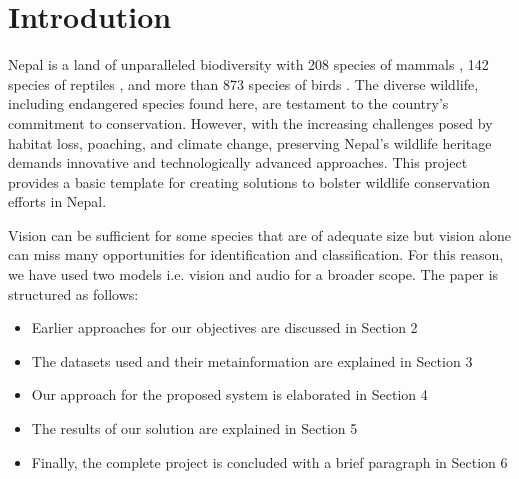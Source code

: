 \documentclass[fleqn, 10pt, twoside]{IOEGC}
\begin{document}
\maketitle
\thispagestyle{firstpage}

\section{Introdution}
Nepal is a land of unparalleled biodiversity with 208 species of mammals \cite{r1}, 142 species of reptiles \cite{r2}, and more than 873 species of birds \cite{r3}. The diverse wildlife, including endangered species found here, are testament to the country’s commitment to conservation. However, with the increasing challenges posed
by habitat loss, poaching, and climate change, preserving Nepal’s wildlife heritage demands innovative and technologically advanced approaches.
This project provides a basic template for creating solutions to bolster wildlife conservation efforts in Nepal.
\par
Vision can be sufficient for some species that are of adequate size but vision alone can miss many opportunities for identification and classification. For this reason, we have used two models i.e. vision and audio for a broader scope.
The paper is structured as follows:
\begin{itemize}
	\item Earlier approaches for our objectives are discussed in Section 2
	\item The datasets used and their metainformation are explained in Section 3
	\item Our approach for the proposed system is elaborated in Section 4
	\item The results of our solution are explained in Section 5
	\item Finally, the complete project is concluded with a brief paragraph in Section 6
\end{itemize}
\end{document}
